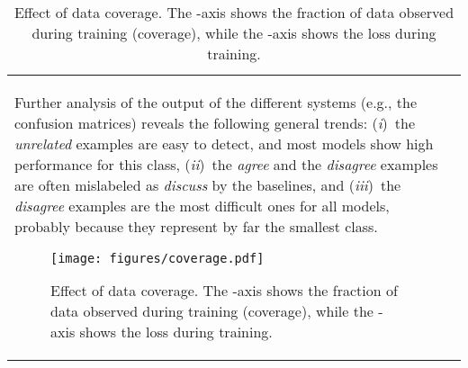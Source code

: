 \documentclass[11pt,a4paper]{article}
\begin{document}
\begin{table}
{\begin{tabularx}{1.15\linewidth}{|lX|}
Further analysis of the output of the different systems (e.g., the confusion matrices) reveals the following general trends:
(\emph{i})~the \emph{unrelated} examples are easy to detect, and most models show high performance for this class, 
(\emph{ii})~the \emph{agree} and the \emph{disagree} examples are often mislabeled as \emph{discuss} by the baselines, and
(\emph{iii})~the \emph{disagree} examples are the most difficult ones for all models, probably because they represent by far the smallest class.
 
\begin{figure}
\centering
\texttt{[image: figures/coverage.pdf]}
\vspace{-1em}
\caption{Effect of data coverage. The -axis shows the fraction of data observed during training (coverage), while the -axis shows the loss during training.}
\label{fig:coverage}
\end{figure}


\end{tabularx}}
\end{table}
\end{document}
